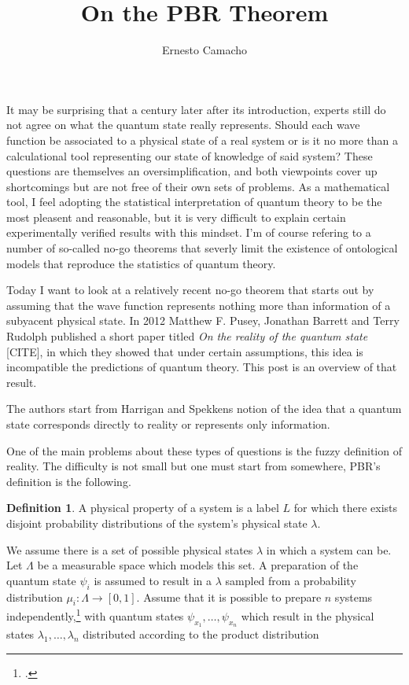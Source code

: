 \documentclass[a4paper]{article}
\title{On the PBR Theorem}
\author{Ernesto Camacho}
\theoremstyle{definition}
\newtheorem{defn}{Definition}
\theoremstyle{plain}
\begin{document}
    \maketitle

    It may be surprising that a century later after its
    introduction, experts still do not agree on what the
    quantum state really represents. Should each wave
    function be associated to a physical state of a real
    system or is it no more than a calculational tool
    representing our state of knowledge of said system?
    These questions are themselves an oversimplification,
    and both viewpoints cover up shortcomings but are not
    free of their own sets of problems. As a mathematical
    tool, I feel adopting the statistical interpretation of
    quantum theory to be the most pleasent and reasonable,
    but it is very difficult to explain certain
    experimentally verified results with this mindset. I'm
    of course refering to a number of so-called no-go
    theorems that severly limit the existence of ontological
    models that reproduce the statistics of quantum theory.
    
    Today I want to look at a relatively recent no-go
    theorem that starts out by assuming that the wave
    function represents nothing more than information of a
    subyacent physical state. In 2012 Matthew F. Pusey,
    Jonathan Barrett and Terry Rudolph published a short
    paper titled \textit{On the reality of the quantum
    state} [CITE], in which they showed that under certain
    assumptions, this idea is incompatible the predictions
    of quantum theory. This post is an overview of that
    result.

    The authors start from Harrigan and Spekkens notion of
    the idea that a quantum state corresponds directly to
    reality or represents only information.

    One of the main problems about these types of questions
    is the fuzzy definition of reality. The difficulty is
    not small but one must start from somewhere, PBR's
    definition is the following.

    \begin{defn}
        A physical property of a system is a label $L$ for
        which there exists disjoint probability
        distributions of the system's physical state
        $\lambda$.
    \end{defn}

    We assume there is a set of possible physical states
    $\lambda$ in which a system can be. Let $\Lambda$ be a
    measurable space which models this set. A preparation of
    the quantum state $\psi_i$ is assumed to result in a
    $\lambda$ sampled from a probability distribution
    $\mu_i : \Lambda \to [0,1]$. Assume that it is possible
    to prepare $n$ systems independently,\footnote{.} with
    quantum states $\psi_{x_1},\ldots,\psi_{x_n}$ which
    result in the physical states
    $\lambda_1,\ldots,\lambda_n$ distributed according to
    the product distribution
\end{document}
